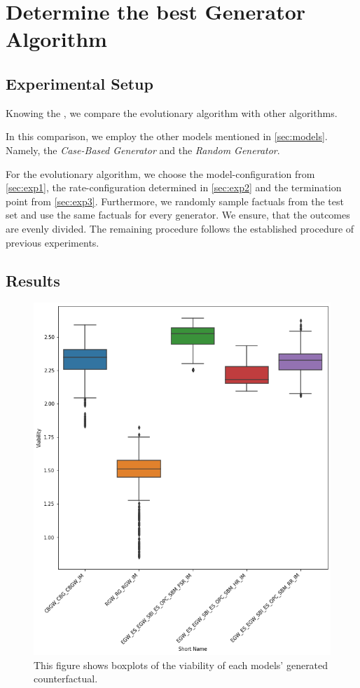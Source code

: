 \documentclass[./../../paper.tex]{subfiles}
\begin{document}
\section{Determine the best Generator Algorithm}

\subsection{Experimental Setup}
\label{sec:exp4}
Knowing the , we compare the evolutionary algorithm with other algorithms. 

In this comparison, we employ the other models mentioned in \autoref{sec:models}. Namely, the \emph{Case-Based Generator} and the \emph{Random Generator}. 

For the evolutionary algorithm, we choose the model-configuration from \autoref{sec:exp1}, the rate-configuration determined in \autoref{sec:exp2} and the termination point from \autoref{sec:exp3}. Furthermore, we randomly sample  factuals from the test set and use the same factuals for every generator. We ensure, that the outcomes are evenly divided. The remaining procedure follows the established procedure of previous experiments.

\subsection{Results}
\begin{figure}[htbp]
    \centering
    \includegraphics[width=\textwidth]{figures/generated/exp4_winner_overall.png}
    \caption{This figure shows boxplots of the viability of each models' generated counterfactual.}
    \label{fig:exp4-winner}
\end{figure}
\end{document}

